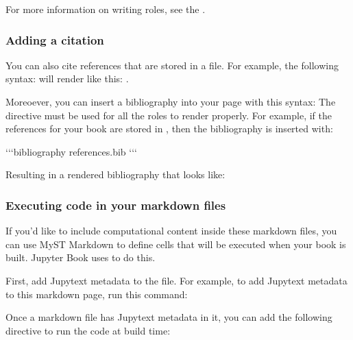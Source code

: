 \documentclass[letterpaper,10pt,english]{sphinxmanual}
\begin{document}
For more information on writing roles, see the
.


\subsubsection{Adding a citation}
\label{\detokenize{markdown:adding-a-citation}}
You can also cite references that are stored in a  file. For example,
the following syntax:  will render like
this: .

Moreoever, you can insert a bibliography into your page with this syntax:
The  directive must be used for all the  roles to
render properly.
For example, if the references for your book are stored in ,
then the bibliography is inserted with:

\begin{sphinxVerbatim}[commandchars=\\\{\}]
{}`{}`{}`\PYGZob{}bibliography\PYGZcb{} references.bib
{}`{}`{}`
\end{sphinxVerbatim}

Resulting in a rendered bibliography that looks like:




\subsubsection{Executing code in your markdown files}
\label{\detokenize{markdown:executing-code-in-your-markdown-files}}
If you’d like to include computational content inside these markdown files,
you can use MyST Markdown to define cells that will be executed when your
book is built. Jupyter Book uses  to do this.

First, add Jupytext metadata to the file. For example, to add Jupytext metadata
to this markdown page, run this command:

\begin{sphinxVerbatim}[commandchars=\\\{\}]
   
\end{sphinxVerbatim}

Once a markdown file has Jupytext metadata in it, you can add the following
directive to run the code at build time:
\end{document}
